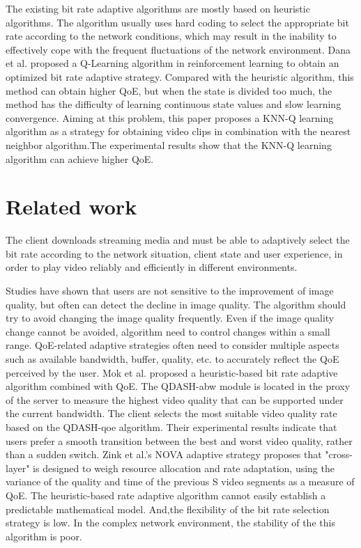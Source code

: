 \documentclass[twocolumn]{article}
\begin{document}
The existing bit rate adaptive algorithms are mostly based on heuristic algorithms. 
The algorithm usually uses hard coding to select the appropriate bit rate according 
to the network conditions, which may result in the inability to effectively
 cope with the frequent fluctuations of the network environment\cite{RN4}.
 Dana et al. proposed a Q-Learning algorithm in reinforcement 
 learning to obtain an optimized bit rate adaptive strategy\cite{RN5}.
 Compared with the heuristic algorithm, this method can obtain higher QoE, 
 but when the state is divided too much, the method has the difficulty
  of learning continuous state values and slow learning convergence.
Aiming at this problem, this paper proposes a KNN-Q learning algorithm 
as a strategy for obtaining video clips in combination with the 
nearest neighbor algorithm.The experimental results 
show that the KNN-Q learning algorithm can achieve higher QoE.

\section{Related work}
The client downloads streaming media and must be able to adaptively select 
the bit rate according to the network situation, client state and user experience, 
in order to play video reliably and efficiently in different environments.

Studies\cite{RN7} have shown that users are not sensitive 
to the improvement of image quality, but often can detect the decline in image quality.
The algorithm should try to avoid changing the image quality frequently. 
Even if the image quality change cannot be avoided, 
algorithm need to control changes within a small range.
QoE-related adaptive strategies often need to consider multiple aspects 
such as available bandwidth, buffer, quality, etc. to accurately reflect the QoE perceived by the user.
Mok et al\cite{RN6}. proposed a heuristic-based bit rate adaptive algorithm combined with QoE.
 The QDASH-abw module is located in the proxy of the server to measure the highest video quality 
 that can be supported under the current bandwidth. 
 The client selects the most suitable video quality rate based on the QDASH-qoe algorithm.
 Their experimental results indicate that users prefer a smooth 
 transition between the best and worst video quality, rather than a sudden switch.
 Zink et al\cite{RN7}.'s NOVA adaptive strategy proposes that "cross-layer" is designed to 
 weigh resource allocation and rate adaptation, using the variance of the quality 
 and time of the previous S video segments as a measure of QoE.
 The heuristic-based rate adaptive algorithm cannot easily establish a predictable mathematical model. 
 And,the flexibility of the bit rate selection strategy is low. 
 In the complex network environment, the stability of the this algorithm is poor.
\end{document}
